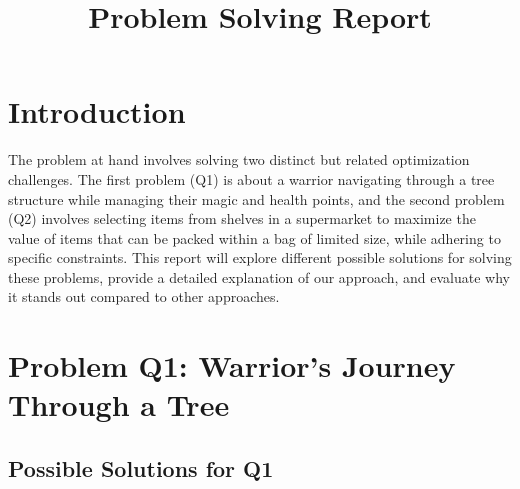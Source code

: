\documentclass{article}
\title{Problem Solving Report}
\author{}
\date{}
\begin{document}
\maketitle

\section{Introduction}
The problem at hand involves solving two distinct but related optimization challenges. The first problem (Q1) is about a warrior navigating through a tree structure while managing their magic and health points, and the second problem (Q2) involves selecting items from shelves in a supermarket to maximize the value of items that can be packed within a bag of limited size, while adhering to specific constraints. This report will explore different possible solutions for solving these problems, provide a detailed explanation of our approach, and evaluate why it stands out compared to other approaches.

\section{Problem Q1: Warrior's Journey Through a Tree}

\subsection{Possible Solutions for Q1}
\end{document}
